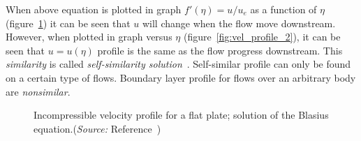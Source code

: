 When above equation is plotted in graph $f'(\eta)=u/u_e$ as a function of $\eta$ (figure~\ref{fig:vel_profile_1}) it can be seen that $u$ will change when the flow move downstream. However, when plotted in graph versus $\eta$ (figure~\ref{fig:vel_profile_2}), it can be seen that $u = u(\eta)$ profile is the same as the flow progress downstream. This \emph{similarity} is called \emph{self-similarity solution}~\cite{JA}. Self-similar profile can only be found on a certain type of flows. Boundary layer profile for flows over an arbitrary body are \emph{nonsimilar}.
\begin{figure}[h]
  \centering	
  \caption{Incompressible velocity profile for a flat plate; solution of the Blasius equation.(\emph{Source:} Reference~\cite{JA})}
  \label{fig:vel_profile_1}
\end{figure}

